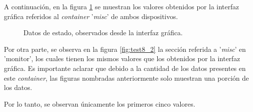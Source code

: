     A continuación, en la figura \ref{fig:test8_1} se muestran los valores obtenidos por la interfaz gráfica referidos al \textit{container} '\textit{misc}' de ambos dispositivos. 

    \begin{figure}[H]
        \centering
        \caption{Datos de estado, observados desde la interfaz gráfica.}
        \label{fig:test8_1}
      \end{figure}

      Por otra parte, se observa en la figura \ref{fig:test8_2} la sección referida a '\textit{misc}' en 'monitor', los cuales tienen los mismos valores que los obtenidos por la interfaz gráfica. Es importante aclarar que debido a la cantidad de los datos presentes en este \textit{container}, las figuras nombradas anteriormente solo muestran una porción de los datos.
      
      Por lo tanto, se observan únicamente los primeros cinco valores.

